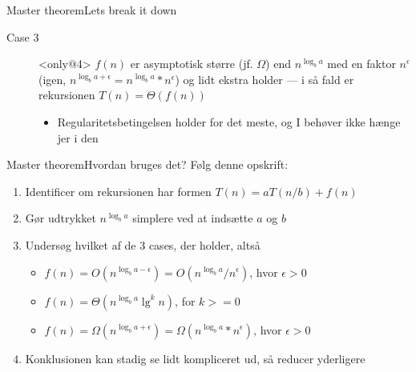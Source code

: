 \documentclass[aspectratio=1610]{beamer}
\begin{document}
\begin{frame}[t]{Master theorem}{Lets break it down}
\begin{description}
        \item[Case 3]<only@4> $f(n)$ er \alert{asymptotisk større} (jf.
            $\Omega$) end $n^{\log_b a}$ med en faktor $n^{\epsilon}$ (igen,
            $n^{\log_b a + \epsilon} = n^{\log_b a} * n^{\epsilon}$) og lidt
            ekstra holder --- i så fald er rekursionen $T(n) = \Theta(f(n))$

            \begin{itemize}
                \small
                \item \alert{Regularitetsbetingelsen} holder for det meste, og I
                    behøver ikke hænge jer i den
            \end{itemize}
    \end{description}
\end{frame}

\begin{frame}{Master theorem}{Hvordan bruges det?}
    Følg denne opskrift:

    \begin{enumerate}
        \item Identificer om rekursionen har formen $T(n) = aT(n/b) + f(n)$
        \item Gør udtrykket $n^{\log_b a}$ simplere ved at indsætte $a$ og $b$
        \item Undersøg hvilket af de 3 cases, der holder, altså
            \begin{itemize}
                \item $f(n) = O(n^{\log_b a - \epsilon}) = O(n^{\log_b
                    a}/n^{\epsilon})$, hvor $\epsilon > 0$
                \item $f(n) = \Theta(n^{\log_b a}\lg^k n)$, for $k >= 0$
                \item $f(n) = \Omega(n^{\log_b a + \epsilon}) = \Omega(n^{\log_b
                    a} * n^{\epsilon})$, hvor $\epsilon > 0$
            \end{itemize}
        \item Konklusionen kan stadig se lidt kompliceret ud, så reducer
            yderligere
    \end{enumerate}
\end{frame}
\end{document}
